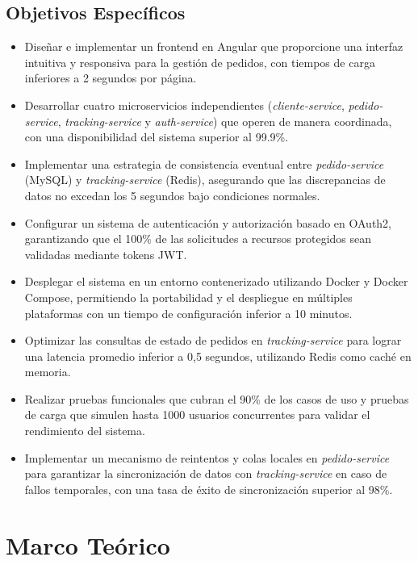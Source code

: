 \documentclass[a4paper,12pt]{article}
\begin{document}
\subsection{Objetivos Específicos}
\begin{itemize}
    \item Diseñar e implementar un frontend en Angular que proporcione una interfaz intuitiva y responsiva para la gestión de pedidos, con tiempos de carga inferiores a 2 segundos por página.
    \item Desarrollar cuatro microservicios independientes (\textit{cliente-service}, \textit{pedido-service}, \textit{tracking-service} y \textit{auth-service}) que operen de manera coordinada, con una disponibilidad del sistema superior al 99.9\%.
    \item Implementar una estrategia de consistencia eventual entre \textit{pedido-service} (MySQL) y \textit{tracking-service} (Redis), asegurando que las discrepancias de datos no excedan los 5 segundos bajo condiciones normales.
    \item Configurar un sistema de autenticación y autorización basado en OAuth2, garantizando que el 100\% de las solicitudes a recursos protegidos sean validadas mediante tokens JWT.
    \item Desplegar el sistema en un entorno contenerizado utilizando Docker y Docker Compose, permitiendo la portabilidad y el despliegue en múltiples plataformas con un tiempo de configuración inferior a 10 minutos.
    \item Optimizar las consultas de estado de pedidos en \textit{tracking-service} para lograr una latencia promedio inferior a 0,5 segundos, utilizando Redis como caché en memoria.
    \item Realizar pruebas funcionales que cubran el 90\% de los casos de uso y pruebas de carga que simulen hasta 1000 usuarios concurrentes para validar el rendimiento del sistema.
    \item Implementar un mecanismo de reintentos y colas locales en \textit{pedido-service} para garantizar la sincronización de datos con \textit{tracking-service} en caso de fallos temporales, con una tasa de éxito de sincronización superior al 98\%.
\end{itemize}
\section{Marco Teórico}
\end{document}
